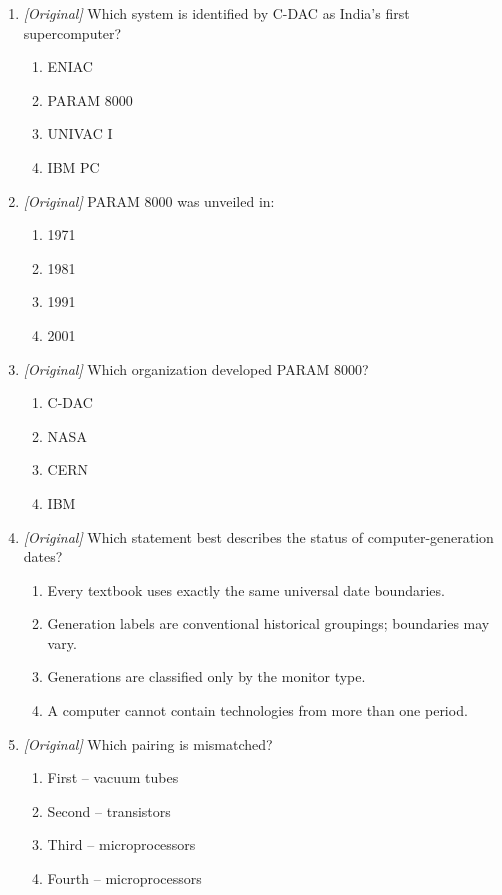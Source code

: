 \documentclass[11pt]{article}
\begin{document}
\begin{enumerate}[label=\textbf{Q\arabic*.}, leftmargin=*]
\item \textit{[Original]} Which system is identified by C-DAC as India's
  first supercomputer?
  \begin{enumerate}[label=\Alph*.]
    \item ENIAC
    \item PARAM 8000
    \item UNIVAC I
    \item IBM PC
  \end{enumerate}
\item \textit{[Original]} PARAM 8000 was unveiled in:
  \begin{enumerate}[label=\Alph*.]
    \item 1971
    \item 1981
    \item 1991
    \item 2001
  \end{enumerate}
\item \textit{[Original]} Which organization developed PARAM 8000?
  \begin{enumerate}[label=\Alph*.]
    \item C-DAC
    \item NASA
    \item CERN
    \item IBM
  \end{enumerate}
\item \textit{[Original]} Which statement best describes the status of
  computer-generation dates?
  \begin{enumerate}[label=\Alph*.]
    \item Every textbook uses exactly the same universal date boundaries.
    \item Generation labels are conventional historical groupings; boundaries
      may vary.
    \item Generations are classified only by the monitor type.
    \item A computer cannot contain technologies from more than one period.
  \end{enumerate}
\item \textit{[Original]} Which pairing is mismatched?
  \begin{enumerate}[label=\Alph*.]
    \item First -- vacuum tubes
    \item Second -- transistors
    \item Third -- microprocessors
    \item Fourth -- microprocessors

\end{enumerate}
\end{enumerate}
\end{document}
